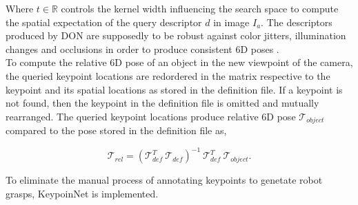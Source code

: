 Where $t \in \mathbb{R}$ controls the kernel width influencing the search space to compute the spatial expectation of the query descriptor $d$ in image $I_a$.
The descriptors produced by \ac{DON} are supposedly to be robust against color jitters, illumination changes and occlusions in order to produce consistent 6D poses \cite{adrian2022efficient}.\\

To compute the relative 6D pose of an object in the new viewpoint of the camera, the queried keypoint locations are redordered in the matrix respective to the keypoint
and its spatial locations as stored in the definition file.
If a keypoint is not found, then the keypoint in the definition file is omitted and mutually rearranged. The queried keypoint locations produce relative 6D pose $\mathcal{T}_{object}$
compared to the pose stored in the definition file as,

\begin{equation}
    \mathcal{T}_{rel} = (\mathcal{T}_{def}^T \ \mathcal{T}_{def})^{-1} \ \mathcal{T}_{def}^T \ \mathcal{T}_{object}.
\end{equation}

To eliminate the manual process of annotating keypoints to genetate robot grasps, KeypoinNet is implemented.
